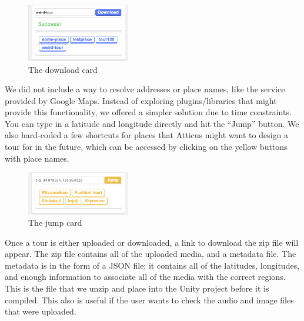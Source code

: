 \documentclass[a4paper, 10pt, american, titlepage]{article}
\begin{document}
\begin{figure}[h]
	\centering
    \includegraphics[width=0.4\textwidth]{download-card-editour.png}
    \caption{The download card}
	\label{fig:downloadCard}
\end{figure}

We did not include a way to resolve addresses or place names, like the service
provided by Google Maps. Instead of exploring plugins/libraries that might
provide this functionality, we offered a simpler solution due to time
constraints.  You can type in a latitude and longitude directly and hit the
``Jump'' button. We also hard-coded a few shortcuts for places that Atticus
might want to design a tour for in the future, which can be accessed by
clicking on the yellow buttons with place names.

\begin{figure}[h]
	\centering
    \includegraphics[width=0.4\textwidth]{jump-card-editour.png}
    \caption{The jump card}
	\label{fig:jumpCard}
\end{figure}

Once a tour is either uploaded or downloaded, a link to download the zip file
will appear. The zip file contains all of the uploaded media, and a metadata
file. The metadata is in the form of a JSON file; it contains all of the
latitudes, longitudes, and enough information to associate all of the media
with the correct regions. This is the file that we unzip and place into the
Unity project before it is compiled. This also is useful if the user wants to
check the audio and image files that were uploaded.
\end{document}
